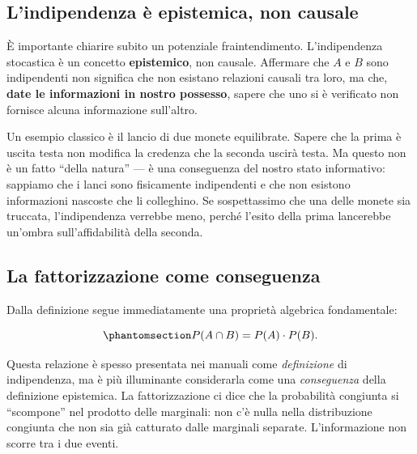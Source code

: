 \documentclass[
  italian,
  letterpaper,
  a4paper,
  11pt,
  open=any]{scrbook}
\theoremstyle{plain}
\theoremstyle{definition}
\theoremstyle{definition}
\theoremstyle{remark}
\begin{document}
\subsection{L'indipendenza è epistemica, non
causale}\label{lindipendenza-uxe8-epistemica-non-causale}

È importante chiarire subito un potenziale fraintendimento.
L'indipendenza stocastica è un concetto \textbf{epistemico}, non
causale. Affermare che \(A\) e \(B\) sono indipendenti non significa che
non esistano relazioni causali tra loro, ma che, \textbf{date le
informazioni in nostro possesso}, sapere che uno si è verificato non
fornisce alcuna informazione sull'altro.

Un esempio classico è il lancio di due monete equilibrate. Sapere che la
prima è uscita testa non modifica la credenza che la seconda uscirà
testa. Ma questo non è un fatto ``della natura'' --- è una conseguenza
del nostro stato informativo: sappiamo che i lanci sono fisicamente
indipendenti e che non esistono informazioni nascoste che li colleghino.
Se sospettassimo che una delle monete sia truccata, l'indipendenza
verrebbe meno, perché l'esito della prima lancerebbe un'ombra
sull'affidabilità della seconda.

\subsection{La fattorizzazione come
conseguenza}\label{la-fattorizzazione-come-conseguenza}

Dalla definizione segue immediatamente una proprietà algebrica
fondamentale:

\begin{equation}\protect\phantomsection\label{eq-independence-factorization}{
P(A \cap B) = P(A) \cdot P(B).
}\end{equation}

Questa relazione è spesso presentata nei manuali come \emph{definizione}
di indipendenza, ma è più illuminante considerarla come una
\emph{conseguenza} della definizione epistemica. La fattorizzazione ci
dice che la probabilità congiunta si ``scompone'' nel prodotto delle
marginali: non c'è nulla nella distribuzione congiunta che non sia già
catturato dalle marginali separate. L'informazione non scorre tra i due
eventi.
\end{document}

